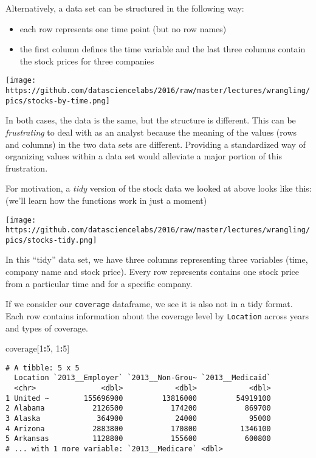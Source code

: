 \documentclass[]{article}
\newenvironment{Shaded}{\begin{snugshade}}{\end{snugshade}}
\newcommand{\DecValTok}[1]{\textcolor[rgb]{0.00,0.00,0.81}{#1}}
\newcommand{\NormalTok}[1]{#1}
\newcommand{\OperatorTok}[1]{\textcolor[rgb]{0.81,0.36,0.00}{\textbf{#1}}}
\providecommand{\tightlist}{%
  \setlength{\itemsep}{0pt}\setlength{\parskip}{0pt}}
\begin{document}
Alternatively, a data set can be structured in the following way:

\begin{itemize}
\tightlist
\item
  each row represents one time point (but no row names)
\item
  the first column defines the time variable and the last three columns
  contain the stock prices for three companies
\end{itemize}

\texttt{[image: https://github.com/datasciencelabs/2016/raw/master/lectures/wrangling/pics/stocks-by-time.png]}

In both cases, the data is the same, but the structure is different.
This can be \emph{frustrating} to deal with as an analyst because the
meaning of the values (rows and columns) in the two data sets are
different. Providing a standardized way of organizing values within a
data set would alleviate a major portion of this frustration.

For motivation, a \emph{tidy} version of the stock data we looked at
above looks like this: (we'll learn how the functions work in just a
moment)

\texttt{[image: https://github.com/datasciencelabs/2016/raw/master/lectures/wrangling/pics/stocks-tidy.png]}

In this ``tidy'' data set, we have three columns representing three
variables (time, company name and stock price). Every row represents
contains one stock price from a particular time and for a specific
company.

If we consider our \texttt{coverage} dataframe, we see it is also not in
a tidy format. Each row contains information about the coverage level by
\texttt{Location} across years and types of coverage.

\begin{Shaded}
\begin{Highlighting}[]
\NormalTok{coverage[}\DecValTok{1}\OperatorTok{:}\DecValTok{5}\NormalTok{, }\DecValTok{1}\OperatorTok{:}\DecValTok{5}\NormalTok{]}
\end{Highlighting}
\end{Shaded}

\begin{verbatim}
# A tibble: 5 x 5
  Location `2013__Employer` `2013__Non-Grou~ `2013__Medicaid`
  <chr>               <dbl>            <dbl>            <dbl>
1 United ~        155696900         13816000         54919100
2 Alabama           2126500           174200           869700
3 Alaska             364900            24000            95000
4 Arizona           2883800           170800          1346100
5 Arkansas          1128800           155600           600800
# ... with 1 more variable: `2013__Medicare` <dbl>
\end{verbatim}
\end{document}
